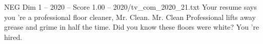 \begin{textsample}{NEG Dim 1 – 2020 – Score 1.00 – 2020/tv\_com\_2020\_21.txt}  \label{ex:f1_neg_017}
Your resume says you 're a professional floor cleaner, Mr.
Clean.
Mr.
Clean Professional lifts away grease and grime in half the time.
Did you know these floors were white?
You 're hired.

\end{textsample}
